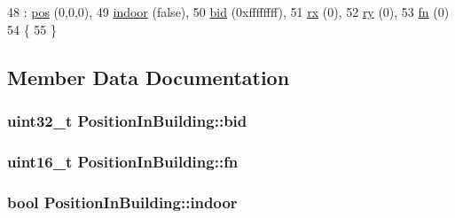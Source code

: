 \begin{DoxyCode}
48   : \hyperlink{structPositionInBuilding_a41887f00f92dbe21cdede9467303a82c}{pos} (0,0,0),
49     \hyperlink{structPositionInBuilding_a3326a8e049a209ba1a54e79ea5e942ac}{indoor} (\textcolor{keyword}{false}),
50     \hyperlink{structPositionInBuilding_a329a040770f0db9391279db2ffe23f78}{bid} (0xffffffff),
51     \hyperlink{structPositionInBuilding_a6ad799c04d47c445f10ea9c58319ee65}{rx} (0),
52     \hyperlink{structPositionInBuilding_a9fd3cce30dc7000c482ef12229cafef0}{ry} (0),
53     \hyperlink{structPositionInBuilding_ad85d460446c8fa65ef019fa48717746a}{fn} (0)
54 \{
55 \}
\end{DoxyCode}


\subsection{Member Data Documentation}
\subsubsection[{\texorpdfstring{bid}{bid}}]{\setlength{\rightskip}{0pt plus 5cm}uint32\+\_\+t Position\+In\+Building\+::bid}\hypertarget{structPositionInBuilding_a329a040770f0db9391279db2ffe23f78}{}\label{structPositionInBuilding_a329a040770f0db9391279db2ffe23f78}
\subsubsection[{\texorpdfstring{fn}{fn}}]{\setlength{\rightskip}{0pt plus 5cm}uint16\+\_\+t Position\+In\+Building\+::fn}\hypertarget{structPositionInBuilding_ad85d460446c8fa65ef019fa48717746a}{}\label{structPositionInBuilding_ad85d460446c8fa65ef019fa48717746a}
\subsubsection[{\texorpdfstring{indoor}{indoor}}]{\setlength{\rightskip}{0pt plus 5cm}bool Position\+In\+Building\+::indoor}\hypertarget{structPositionInBuilding_a3326a8e049a209ba1a54e79ea5e942ac}{}\label{structPositionInBuilding_a3326a8e049a209ba1a54e79ea5e942ac}
